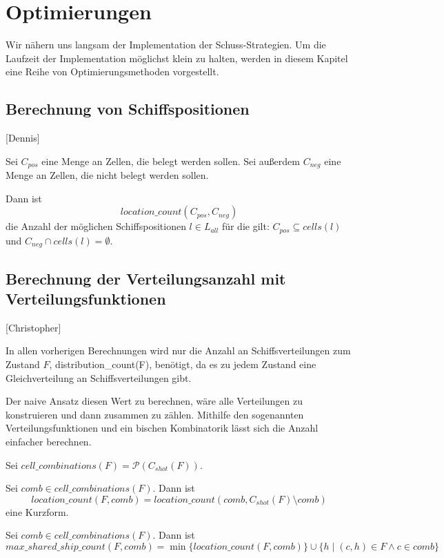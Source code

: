 \documentclass[a4paper,12pt]{llncs}
\numberwithin{equation}{section}
\begin{document}
\newpage

\section{Optimierungen}

Wir nähern uns langsam der Implementation der Schuss-Strategien.
Um die Laufzeit der Implementation möglichst klein zu halten, werden in diesem Kapitel eine Reihe von Optimierungsmethoden vorgestellt.

\subsection{Berechnung von Schiffspositionen}[Dennis]
\begin{definition}
Sei $C_{pos}$ eine Menge an Zellen, die belegt werden sollen. Sei außerdem $C_{neg}$ eine Menge an Zellen, die nicht belegt werden sollen.

Dann ist
\[
location\_count(C_{pos}, C_{neg})
\]
die Anzahl der möglichen Schiffspositionen $l \in L_{all}$ für die gilt: $C_{pos} \subseteq cells(l)$ und $C_{neg} \cap cells(l) = \emptyset$.
\end{definition}

\subsection{Berechnung der Verteilungsanzahl mit Verteilungsfunktionen}[Christopher]

In allen vorherigen Berechnungen wird nur die Anzahl an Schiffsverteilungen zum Zustand $F$, distribution\_count(F), benötigt, da es zu jedem Zustand eine Gleichverteilung an Schiffsverteilungen gibt.

Der naive Ansatz diesen Wert zu berechnen, wäre alle Verteilungen zu konstruieren und dann zusammen zu zählen.
Mithilfe den sogenannten Verteilungsfunktionen und ein bischen Kombinatorik lässt sich die Anzahl einfacher berechnen.

\begin{definition}
Sei $cell\_combinations(F)=\mathcal{P}(C_{shot}(F))$.
\end{definition}

\begin{definition}
Sei $comb \in cell\_combinations(F)$. Dann ist
\[
location\_count(F,comb)=location\_count(comb, C_{shot}(F) \setminus comb)
\]
eine Kurzform.
\end{definition}

\begin{definition}
Sei $comb \in cell\_combinations(F)$. Dann ist
\[
max\_shared\_ship\_count(F,comb)=\min\{location\_count(F, comb)\} \cup \{h \mid (c,h) \in F \wedge c \in comb\}
\]
\end{definition}
\end{document}
